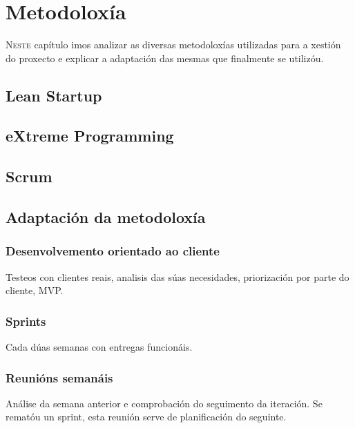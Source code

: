 \chapter{Metodoloxía}
\minitoc
\label{chap:Metodoloxia}
\vspace{0.5cm}


  \lettrine{N}{este} capítulo imos analizar as diversas metodoloxías utilizadas para a 
xestión do proxecto e explicar a adaptación das mesmas que finalmente se utilizóu.

  \section{Lean Startup}

  \section{eXtreme Programming}

  \section{Scrum}

  \section{Adaptación da metodoloxía}
    \subsection{Desenvolvemento orientado ao cliente}
      Testeos con clientes reais, analisis das súas necesidades, priorización por parte 
do cliente, MVP.

    \subsection{Sprints}
    Cada dúas semanas con entregas funcionáis.

    \subsection{Reunións semanáis}
    Análise da semana anterior e comprobación do seguimento da iteración.
    Se rematóu un sprint, esta reunión serve de planificación do seguinte.

